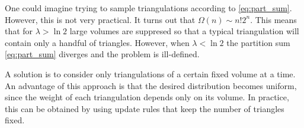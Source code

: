 One could imagine trying to sample triangulations according to \eqref{eq:part_sum}. However, this is not very practical. It turns out that $\Omega(n) \sim n! 2^n$. This means that for $\lambda > \ln 2$ large volumes are suppresed so that a typical triangulation will contain only a handful of triangles. However, when $\lambda < \ln 2$ the partition sum \eqref{eq:part_sum} diverges and the problem is ill-defined.

A solution is to consider only triangulations of a certain fixed volume at a time. An advantage of this approach is that the desired distribution becomes uniform, since the weight of each triangulation depends only on its volume. In practice, this can be obtained by using update rules that keep the number of triangles fixed.
